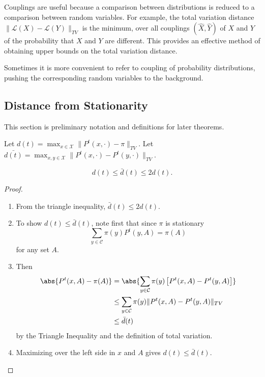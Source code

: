\documentclass[12pt]{article}
\begin{document}

\begin{remark}
    Couplings are useful because a comparison between distributions is
    reduced to a comparison between random variables.  For example, the
    total variation distance \( \| \mathcal{L}(X) - \mathcal{L}(Y) \|_{TV}
    \) is the minimum, over all couplings \( (\hat{X}, \hat{Y} ) \) of \(
    X \) and \( Y \) of the probability that \( X \) and \( Y \) are
    different.  This provides an effective method of obtaining upper
    bounds on the total variation distance.
\end{remark}

\begin{remark}
    Sometimes it is more convenient to refer to coupling of probability
    distributions, pushing the corresponding random variables to the
    background.
\end{remark}

\subsection*{Distance from Stationarity}

This section is preliminary notation and definitions for later theorems.

Let \( d(t)= \max_{x \in \mathcal{X}} \| P^t(x,\cdot) - \pi \|_{TV} \).
Let \( \bar{d(t)}= \max_{x,y \in \mathcal{X}} \| P^t(x,\cdot) - P^t(y,\cdot)
\|_{TV} \).

\begin{lemma}
    \[
        d(t) \le \bar{d}(t) \le 2 d(t).
    \]
\end{lemma}

\begin{proof}
    \begin{enumerate}
        \item
            From the triangle inequality, \( \bar{d}(t) \le 2 d(t) \).
        \item
            To show \( d(t) \le \bar{d}(t) \), note first that since \(
            \pi \) is stationary
            \[
                \sum_{y \in \mathcal{C}} \pi(y) P^t(y,A) = \pi(A)
            \] for any set \( A \).
        \item
            Then
            \begin{align*}
                \abs{ P^t(x,A) - \pi(A)} &= \abs{\sum_{y \in \mathcal{C}}
                \pi(y) \left[ P^t(x,A) - P^t(y,A) \right]} \\
                &\le \sum_{y \in \mathcal{C}} \pi(y) \| P^t(x,A) - P^t(y,A)
                \|_{TV} \\
                &\le \bar{d}(t)
            \end{align*}
            by the Triangle Inequality and the definition of total
            variation.
        \item
            Maximizing over the left side in \( x \) and \( A \) gives \(
            d(t) \le \bar{d}(t) \).
    \end{enumerate}
\end{proof}
\end{document}
